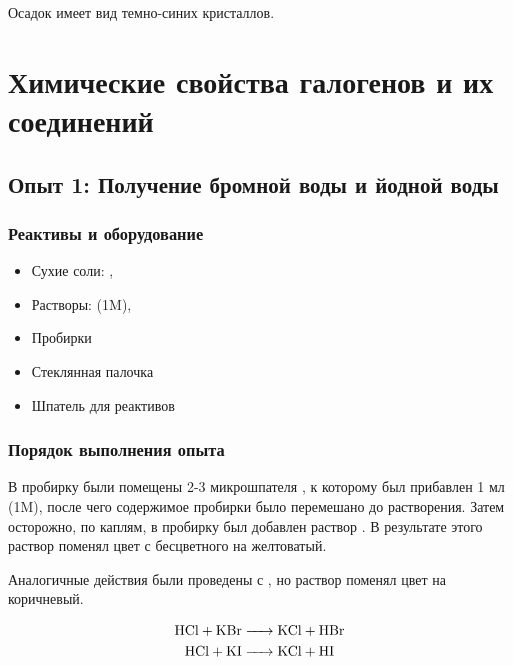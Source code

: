 \documentclass[a4paper, 12pt]{article}
\begin{document}
Осадок имеет вид темно-синих кристаллов.


\newpage


\section{Химические свойства галогенов и их соединений}


\subsection{Опыт 1: Получение бромной воды и йодной воды}

\subsubsection{Реактивы и оборудование}

\begin{itemize}
	\item Сухие соли: , 
	\item Растворы:  (1M), 
	
	\item Пробирки
	
	\item Стеклянная палочка
	
	\item Шпатель для реактивов
\end{itemize}

\subsubsection{Порядок выполнения опыта}

В пробирку были помещены 2-3 микрошпателя , к которому был прибавлен 1 мл  (1M), после чего содержимое пробирки было перемешано до растворения. Затем осторожно, по каплям, в пробирку был добавлен раствор . В результате этого раствор поменял цвет с бесцветного на желтоватый.

Аналогичные действия были проведены с , но раствор поменял цвет на коричневый.

\begin{align}
	\ce{HCl + KBr &-> KCl + HBr}\\
	\ce{HCl + KI &-> KCl + HI}
\end{align}
\end{document}
